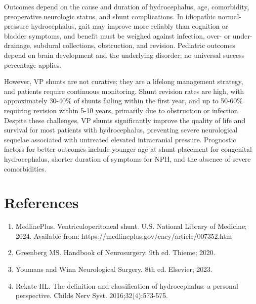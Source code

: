 Outcomes depend on the cause and duration of hydrocephalus, age, comorbidity, preoperative neurologic status, and shunt complications. In idiopathic normal-pressure hydrocephalus, gait may improve more reliably than cognition or bladder symptoms, and benefit must be weighed against infection, over- or under-drainage, subdural collections, obstruction, and revision. Pediatric outcomes depend on brain development and the underlying disorder; no universal success percentage applies.

However, VP shunts are not curative; they are a lifelong management strategy, and patients require continuous monitoring. Shunt revision rates are high, with approximately 30-40\% of shunts failing within the first year, and up to 50-60\% requiring revision within 5-10 years, primarily due to obstruction or infection. Despite these challenges, VP shunts significantly improve the quality of life and survival for most patients with hydrocephalus, preventing severe neurological sequelae associated with untreated elevated intracranial pressure. Prognostic factors for better outcomes include younger age at shunt placement for congenital hydrocephalus, shorter duration of symptoms for NPH, and the absence of severe comorbidities.

\section*{References}
\begin{enumerate}
  \item MedlinePlus. Ventriculoperitoneal shunt. U.S. National Library of Medicine; 2024. Available from: https://medlineplus.gov/ency/article/007352.htm
  
  \item Greenberg MS. Handbook of Neurosurgery. 9th ed. Thieme; 2020.
  
  \item Youmans and Winn Neurological Surgery. 8th ed. Elsevier; 2023.
  
  \item Rekate HL. The definition and classification of hydrocephalus: a personal perspective. Childs Nerv Syst. 2016;32(4):573-575.
\end{enumerate}

\clearpage

